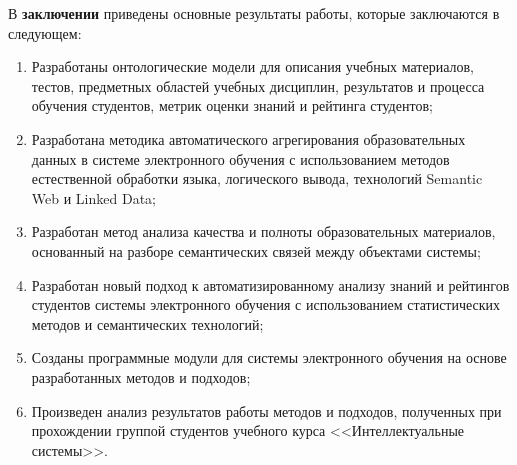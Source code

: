 В \textbf{заключении} приведены основные результаты работы, которые заключаются в следующем:
\begin{enumerate}
 \item Разработаны онтологические модели для описания учебных материалов, тестов, предметных областей учебных дисциплин, результатов и процесса обучения студентов, метрик оценки знаний и рейтинга студентов;
 \item Разработана методика автоматического агрегирования образовательных данных в системе электронного обучения с использованием методов естественной обработки языка, логического вывода, технологий Semantic Web и Linked Data;
 \item Разработан метод анализа качества и полноты образовательных материалов, основанный на разборе семантических связей между объектами системы;
  \item Разработан новый подход к автоматизированному анализу знаний и рейтингов студентов системы электронного обучения с использованием статистических методов и семантических технологий;
  \item Созданы программные модули для системы электронного обучения на основе разработанных методов и подходов;
  \item Произведен анализ результатов работы методов и подходов, полученных при прохождении группой студентов учебного курса <<Интеллектуальные системы>>.
  \end{enumerate}



\renewcommand{\refname}{\Large Публикации автора по теме диссертации}
\nocite{*}
